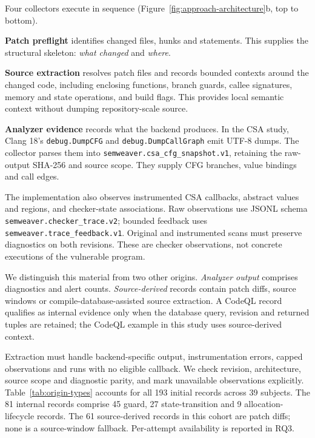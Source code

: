 Four collectors execute in sequence (Figure~\ref{fig:approach-architecture}b, top to bottom).

\textbf{Patch preflight} identifies changed files, hunks and statements.
This supplies the structural skeleton: \emph{what changed} and \emph{where}.

\textbf{Source extraction} resolves patch files and records bounded contexts around the changed code, including enclosing functions, branch guards, callee signatures, memory and state operations, and build flags.
This provides local semantic context without dumping repository-scale source.

\textbf{Analyzer evidence} records what the backend produces.
In the CSA study, Clang 18's \texttt{debug.DumpCFG} and \texttt{debug.DumpCallGraph} emit UTF-8 dumps.
The collector parses them into \texttt{semweaver.csa\_cfg\_snapshot.v1}, retaining the raw-output SHA-256 and source scope.
They supply CFG branches, value bindings and call edges.

The implementation also observes instrumented CSA callbacks, abstract values and regions, and checker-state associations.
Raw observations use JSONL schema \texttt{semweaver.checker\_trace.v2}; bounded feedback uses \texttt{semweaver.trace\_feedback.v1}.
Original and instrumented scans must preserve diagnostics on both revisions.
These are checker observations, not concrete executions of the vulnerable program.

We distinguish this material from two other origins.
\emph{Analyzer output} comprises diagnostics and alert counts.
\emph{Source-derived} records contain patch diffs, source windows or compile-database-assisted source extraction.
A CodeQL record qualifies as internal evidence only when the database query, revision and returned tuples are retained; the CodeQL example in this study uses source-derived context.

Extraction must handle backend-specific output, instrumentation errors, capped observations and runs with no eligible callback.
We check revision, architecture, source scope and diagnostic parity, and mark unavailable observations explicitly.
Table~\ref{tab:origin-types} accounts for all 193 initial records across 39 subjects.
The 81 internal records comprise 45 guard, 27 state-transition and 9 allocation-lifecycle records.
The 61 source-derived records in this cohort are patch diffs; none is a source-window fallback.
Per-attempt availability is reported in RQ3.

